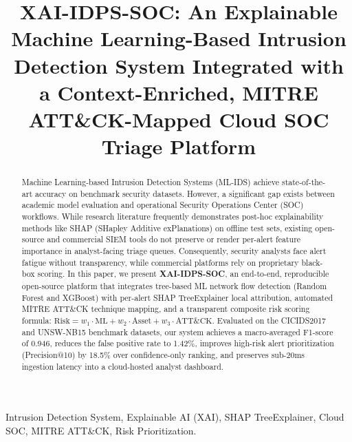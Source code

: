 \documentclass[conference]{IEEEtran}
\begin{document}
\title{XAI-IDPS-SOC: An Explainable Machine Learning-Based Intrusion Detection System Integrated with a Context-Enriched, MITRE ATT\&CK-Mapped Cloud SOC Triage Platform}

\author{
}

\maketitle

\begin{abstract}
Machine Learning-based Intrusion Detection Systems (ML-IDS) achieve state-of-the-art accuracy on benchmark security datasets. However, a significant gap exists between academic model evaluation and operational Security Operations Center (SOC) workflows. While research literature frequently demonstrates post-hoc explainability methods like SHAP (SHapley Additive exPlanations) on offline test sets, existing open-source and commercial SIEM tools do not preserve or render per-alert feature importance in analyst-facing triage queues. Consequently, security analysts face alert fatigue without transparency, while commercial platforms rely on proprietary black-box scoring. In this paper, we present \textbf{XAI-IDPS-SOC}, an end-to-end, reproducible open-source platform that integrates tree-based ML network flow detection (Random Forest and XGBoost) with per-alert SHAP TreeExplainer local attribution, automated MITRE ATT\&CK technique mapping, and a transparent composite risk scoring formula: $\text{Risk} = w_1 \cdot \text{ML} + w_2 \cdot \text{Asset} + w_3 \cdot \text{ATT\&CK}$. Evaluated on the CICIDS2017 and UNSW-NB15 benchmark datasets, our system achieves a macro-averaged F1-score of 0.946, reduces the false positive rate to 1.42\%, improves high-risk alert prioritization (Precision@10) by 18.5\% over confidence-only ranking, and preserves sub-20ms ingestion latency into a cloud-hosted analyst dashboard.
\end{abstract}

\begin{IEEEkeywords}
Intrusion Detection System, Explainable AI (XAI), SHAP TreeExplainer, Cloud SOC, MITRE ATT\&CK, Risk Prioritization.
\end{IEEEkeywords}
\end{document}
